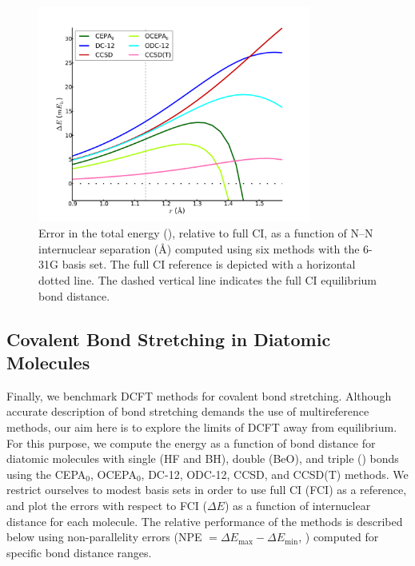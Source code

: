 \begin{figure}
	\centering
	\caption{%
        \label{n2-f}
        Error in the total energy (\mhartree), relative to full CI, as a
        function of N--N internuclear separation (\AA) computed using six
        methods with the 6-31G basis set.
        The full CI reference is depicted with a horizontal dotted line.
        The dashed vertical line indicates the full CI equilibrium bond
        distance.
	}
	\includegraphics[width=0.8\textwidth]{figures/n2.pdf}
\end{figure}



\subsection{Covalent Bond Stretching in Diatomic Molecules}

Finally, we benchmark DCFT methods for covalent bond stretching.
Although accurate description of bond stretching demands the use of
multireference methods, our aim here is to explore the limits of DCFT away from
equilibrium.
For this purpose, we compute the energy as a function of bond distance for
diatomic molecules with single (HF and BH), double (BeO), and triple ()
bonds using the CEPA$_0$, OCEPA$_0$, DC-12, ODC-12, CCSD, and CCSD(T) methods.
We restrict ourselves to modest basis sets in order to use full CI (FCI) as a
reference, and plot the errors with respect to FCI ($\Delta E$) as a function of
internuclear distance for each molecule.
The relative performance of the methods is described below using non-parallelity
errors (NPE $=\Delta E_\mathrm{max}-\Delta E_\mathrm{min}$, \mhartree) computed
for specific bond distance ranges.


